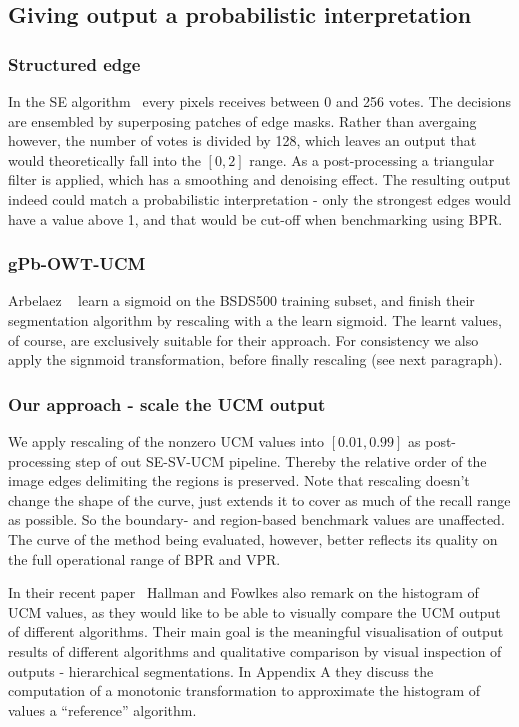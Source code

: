 \subsection{Giving output a probabilistic interpretation}

\subsubsection*{Structured edge}
In the SE algorithm~\cite{DollarICCV13edges,Dollar2015PAMI} every pixels receives between 0 and 256 votes. The decisions are ensembled by superposing patches of edge masks. Rather than avergaing however, the number of votes is divided by 128, which leaves an output that would theoretically fall into the $[0, 2]$ range. As a post-processing a triangular filter is applied, which has a smoothing and denoising effect. The resulting output indeed could match a probabilistic interpretation - only the strongest edges would have a value above 1, and that would be cut-off when benchmarking using BPR.

\subsubsection*{gPb-OWT-UCM}
Arbelaez \etal~\cite{Arbelaez11} learn a sigmoid on the BSDS500 training subset, and finish their segmentation algorithm by rescaling with a the learn sigmoid. The learnt values, of course, are exclusively suitable for their approach. For consistency we also apply the signmoid transformation, before finally rescaling (see next paragraph).

\subsubsection*{Our approach - scale the UCM output} %
We apply rescaling of the nonzero UCM values into $[0.01, 0.99]$ as post-processing step of out SE-SV-UCM pipeline. Thereby the relative order of the image edges delimiting the regions is preserved. Note that rescaling doesn't change the shape of the curve, just extends it to cover as much of the recall range as possible. So the boundary- and region-based benchmark values are unaffected. The curve of the method being evaluated, however, better reflects its quality on the full operational range of BPR and VPR.

In their recent paper~\cite{Hallman2014} Hallman and Fowlkes also remark on the histogram of UCM values, as they would like to be able to visually compare the UCM output of different algorithms. Their main goal is the meaningful visualisation of output results of different algorithms and qualitative comparison by visual inspection of outputs - hierarchical segmentations. In Appendix A they discuss the computation of a monotonic transformation to approximate the histogram of values \wrt a ``reference'' algorithm.
